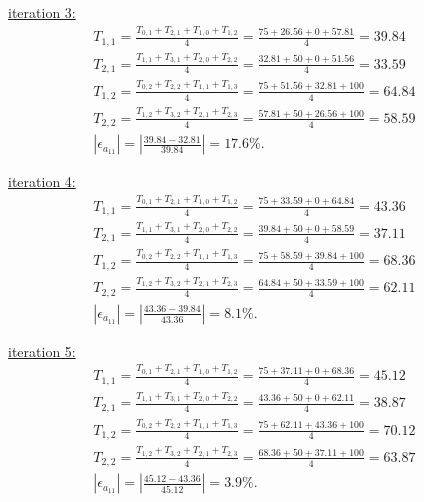 \documentclass{article}
\begin{document}
\underline{iteration 3:}
\begin{align*}
  &T_{1,1} = \frac{T_{0,1} + T_{2,1} + T_{1,0} + T_{1,2}}{4}
  = \frac{75 + 26.56 + 0 + 57.81}{4} = 39.84 &&\\
  &T_{2,1} = \frac{T_{1,1} + T_{3,1} +  T_{2,0} + T_{2,2}}{4}
  = \frac{32.81 + 50 + 0 + 51.56}{4} = 33.59 &&\\
  &T_{1,2} = \frac{T_{0,2} + T_{2,2} +  T_{1,1} + T_{1,3}}{4}
  = \frac{75 + 51.56 + 32.81 + 100}{4} = 64.84 &&\\
  &T_{2,2} = \frac{T_{1,2} + T_{3,2} +  T_{2,1} + T_{2,3}}{4}
  = \frac{57.81 + 50 + 26.56 + 100}{4} = 58.59 &&\\
  &\left|\epsilon_{a_{11}}\right| = \left|\frac{39.84 - 32.81}{39.84}\right| = 17.6\%.
\end{align*}

\underline{iteration 4:}
\begin{align*}
  &T_{1,1} = \frac{T_{0,1} + T_{2,1} + T_{1,0} + T_{1,2}}{4}
  = \frac{75 + 33.59 + 0 + 64.84}{4} = 43.36 &&\\
  &T_{2,1} = \frac{T_{1,1} + T_{3,1} +  T_{2,0} + T_{2,2}}{4}
  = \frac{39.84 + 50 + 0 + 58.59}{4} = 37.11 &&\\
  &T_{1,2} = \frac{T_{0,2} + T_{2,2} +  T_{1,1} + T_{1,3}}{4}
  = \frac{75 + 58.59 + 39.84 + 100}{4} = 68.36 &&\\
  &T_{2,2} = \frac{T_{1,2} + T_{3,2} +  T_{2,1} + T_{2,3}}{4}
  = \frac{64.84 + 50 + 33.59 + 100}{4} = 62.11 &&\\
  &\left|\epsilon_{a_{11}}\right| = \left|\frac{43.36 - 39.84}{43.36}\right| = 8.1\%.
\end{align*}

\underline{iteration 5:}
\begin{align*}
  &T_{1,1} = \frac{T_{0,1} + T_{2,1} + T_{1,0} + T_{1,2}}{4}
  = \frac{75 + 37.11 + 0 + 68.36}{4} = 45.12 &&\\
  &T_{2,1} = \frac{T_{1,1} + T_{3,1} +  T_{2,0} + T_{2,2}}{4}
  = \frac{43.36 + 50 + 0 + 62.11}{4} = 38.87 &&\\
  &T_{1,2} = \frac{T_{0,2} + T_{2,2} +  T_{1,1} + T_{1,3}}{4}
  = \frac{75 + 62.11 + 43.36 + 100}{4} = 70.12 &&\\
  &T_{2,2} = \frac{T_{1,2} + T_{3,2} +  T_{2,1} + T_{2,3}}{4}
  = \frac{68.36 + 50 + 37.11 + 100}{4} = 63.87 &&\\
  &\left|\epsilon_{a_{11}}\right| = \left|\frac{45.12 - 43.36}{45.12}\right| = 3.9\%.
\end{align*}
\end{document}
